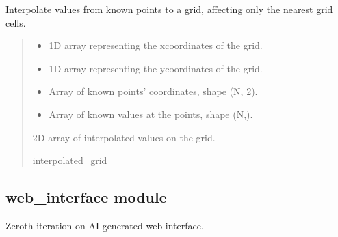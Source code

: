 \documentclass[letterpaper,10pt,english]{sphinxmanual}
\begin{document}

\begin{fulllineitems}
\label{\detokenize{source/stattools:stattools.reverse_interpolation_nearest}}
\pysigstartsignatures
\pysiglinewithargsret
{}
{\sphinxparamcomma {}\sphinxparamcomma {}\sphinxparamcomma {}}
{}
\pysigstopsignatures
\sphinxAtStartPar
Interpolate values from known points to a grid, affecting only the nearest grid cells.
\begin{quote}\begin{description}
\begin{itemize}
\item {} 
\sphinxAtStartPar
{} \textendash{} 1D array representing the x\sphinxhyphen{}coordinates of the grid.

\item {} 
\sphinxAtStartPar
{} \textendash{} 1D array representing the y\sphinxhyphen{}coordinates of the grid.

\item {} 
\sphinxAtStartPar
{} \textendash{} Array of known points’ coordinates, shape (N, 2).

\item {} 
\sphinxAtStartPar
{} \textendash{} Array of known values at the points, shape (N,).

\end{itemize}

\sphinxAtStartPar
2D array of interpolated values on the grid.

\sphinxAtStartPar
interpolated\_grid

\end{description}\end{quote}

\end{fulllineitems}


\sphinxstepscope


\subsection{web\_interface module}
\label{\detokenize{source/web_interface:module-web_interface}}\label{\detokenize{source/web_interface:web-interface-module}}\label{\detokenize{source/web_interface::doc}}
\sphinxAtStartPar
Zeroth iteration on AI generated web interface.
\end{document}
